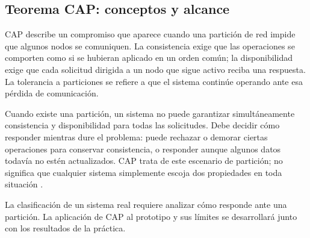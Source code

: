 \subsection{Teorema CAP: conceptos y alcance}

CAP describe un compromiso que aparece cuando una partición de red impide que algunos nodos se comuniquen. La consistencia exige que las operaciones se comporten como si se hubieran aplicado en un orden común; la disponibilidad exige que cada solicitud dirigida a un nodo que sigue activo reciba una respuesta. La tolerancia a particiones se refiere a que el sistema continúe operando ante esa pérdida de comunicación.

Cuando existe una partición, un sistema no puede garantizar simultáneamente consistencia y disponibilidad para todas las solicitudes. Debe decidir cómo responder mientras dure el problema: puede rechazar o demorar ciertas operaciones para conservar consistencia, o responder aunque algunos datos todavía no estén actualizados. CAP trata de este escenario de partición; no significa que cualquier sistema simplemente escoja dos propiedades en toda situación \cite{lee2023cap,vanSteenTanenbaum2023}.

La clasificación de un sistema real requiere analizar cómo responde ante una partición. La aplicación de CAP al prototipo y sus límites se desarrollará junto con los resultados de la práctica.
